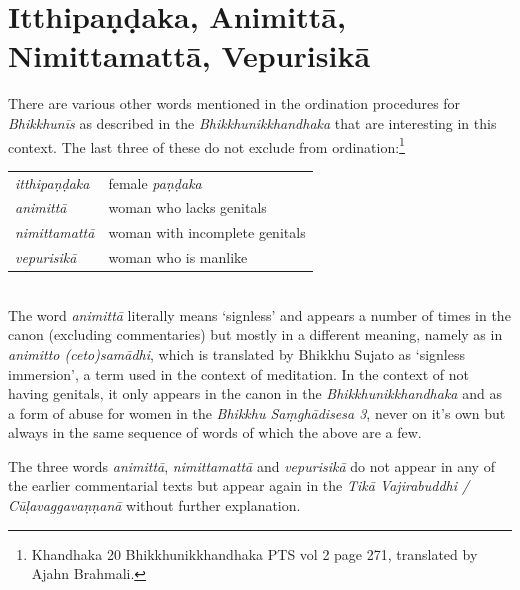 \section{Itthipaṇḍaka, Animittā, Nimittamattā, Vepurisikā}

There are various other words mentioned in the ordination procedures for {\em Bhikkhunīs} as described in the {\em Bhikkhunikkhandhaka} that are interesting in this context. The last three of these do not exclude from ordination:\footnote{Khandhaka 20 Bhikkhunikkhandhaka PTS vol 2 page 271, translated by Ajahn Brahmali.} \\

\begin{tabular}{ l l }
 {\em itthipaṇḍaka} & female {\em paṇḍaka} \\
 {\em animittā } & woman who lacks genitals \\
 {\em nimittamattā } & woman with incomplete genitals \\ 
 {\em vepurisikā } & woman who is manlike \\
\end{tabular} \\

The word {\em animittā} literally means `signless' and appears a number of times in the canon (excluding commentaries) but mostly in a different meaning, namely as in {\em animitto (ceto)samādhi}, which is translated by Bhikkhu Sujato as `signless immersion', a term used in the context of meditation. In the context of not having genitals, it only appears in the canon in the {\em Bhikkhunikkhandhaka} and as a form of abuse for women in the {\em Bhikkhu Saṃ­ghā­di­sesa­ 3}, never on it's own but always in the same sequence of words of which the above are a few.

The three words  {\em animittā}, {\em nimittamattā} and {\em vepurisikā} do not appear in any of the earlier commentarial texts but appear again in the {\em Tikā Vajirabuddhi / Cūḷavaggavaṇṇanā} without further explanation.

